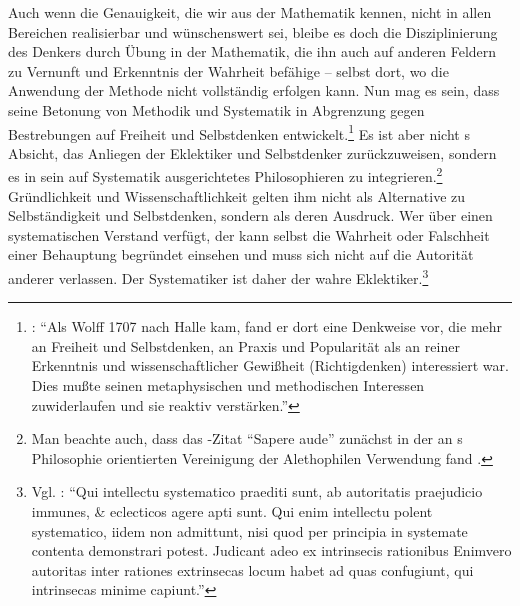 Auch wenn die Genauigkeit, die wir aus der Mathematik kennen, nicht in allen
Bereichen realisierbar und wünschenswert sei, bleibe es doch die Disziplinierung
des Denkers durch Übung in der Mathematik, die ihn auch auf anderen Feldern zu
Vernunft und Erkenntnis der Wahrheit befähige -- selbst dort, wo die Anwendung
der Methode nicht vollständig erfolgen kann. Nun mag es sein, dass
 seine Betonung von Methodik und
Systematik in Abgrenzung gegen Bestrebungen auf Freiheit und Selbstdenken
entwickelt.\footnote{\cite[Vgl.][12]{Schneiders:Deusestphilosophusabsolutesummus1986}:
\enquote{Als Wolff 1707 nach Halle kam, fand er dort eine Denkweise vor, die
mehr an Freiheit und Selbstdenken, an Praxis und Popularität als an reiner
Erkenntnis und wissenschaftlicher Gewißheit (Richtigdenken) interessiert war.
Dies mußte seinen metaphysischen und methodischen Interessen zuwiderlaufen und
sie reaktiv verstärken.}} Es ist aber nicht s Absicht, das Anliegen
der Eklektiker und Selbstdenker zurückzuweisen, sondern es in sein auf
Systematik ausgerichtetes Philosophieren zu integrieren.\footnote{Man beachte
auch, dass das -Zitat \enquote{Sapere aude} zunächst in der an
s Philosophie orientierten Vereinigung der Alethophilen
Verwendung fand
\parencite[vgl.][\pno~255\,f.]{Bronisch:WasistAufklaerung?2011}.} Gründlichkeit
und Wissenschaftlichkeit gelten ihm nicht als Alternative zu Selbständigkeit und
Selbstdenken, sondern als deren Ausdruck. Wer über einen systematischen Verstand
verfügt, der kann selbst die Wahrheit oder Falschheit einer Behauptung begründet
einsehen und muss sich nicht auf die Autorität anderer verlassen. Der
Systematiker ist daher der wahre
Eklektiker.\footnote{\label{Stellenverweis:Wolff:SelbstaendigkeitnurdurchKompetenz}Vgl.
\cite[\S~16]{Wolff:Dedifferentiaintellectussystematici&nonsystematici2011}:
  \enquote{Qui intellectu systematico praediti sunt, ab autoritatis praejudicio
  immunes, {\&} eclecticos agere apti sunt. Qui enim intellectu polent
  systematico, iidem non admittunt, nisi quod per principia in
  systemate contenta demonstrari potest. Judicant adeo ex intrinsecis
  rationibus\punkt{} Enimvero autoritas inter rationes extrinsecas locum
  habet ad quas confugiunt, qui intrinsecas minime capiunt.}}

